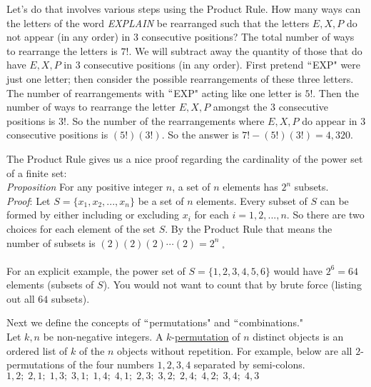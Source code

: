 \documentclass[12pt]{amsart}
\theoremstyle{definition}
\theoremstyle{remark}
\begin{document}
Let's do that involves various steps using the Product Rule.  How many ways can the letters of the word \emph{EXPLAIN} be rearranged such that the letters $E,X,P$ do not appear (in any order) in $3$ consecutive positions?  The total number of ways to rearrange the letters is $7!$.  We will subtract away the quantity of those that do have $E,X,P$ in $3$ consecutive positions (in any order).  First pretend $``$EXP" were just one letter; then consider the possible rearrangements of these three letters.  The number of rearrangements with $``$EXP" acting like one letter is $5!$.  Then the number of ways to rearrange the letter $E,X,P$ amongst the $3$ consecutive positions is $3!$.  So the number of the rearrangements where $E,X,P$ do appear in $3$ consecutive positions is $(5!)(3!)$.  So the answer is $7!-(5!)(3!)=4,320$.




The Product Rule gives us a nice proof regarding the cardinality of the power set of a finite set:\\

\emph{Proposition} For any positive integer $n$, a set of $n$ elements has $2^{n}$ subsets.\\

\emph{Proof}:   Let $S=\{x_1,x_2,...,x_n\}$ be a set of $n$ elements.  Every subset of $S$ can be formed by either including or excluding $x_i$ for each $i=1,2,...,n$.  So there are two choices for each element of the set $S$.  By the Product Rule that means the number of subsets is $(2)(2)(2)\cdots (2)=2^n\;_{\square}$\\ \\

For an explicit example, the power set of $S=\{1,2,3,4,5,6\}$ would have $2^6=64$ elements (subsets of $S$).  You would not want to count that by brute force (listing out all $64$ subsets).


\newpage

Next we define the concepts of $``$permutations" and $``$combinations."\\

Let $k,n$ be non-negative integers.  A $k$-\underline{permutation} of $n$ distinct objects is an ordered list of $k$ of the $n$ objects without repetition.    For example, below are all $2$-permutations of the four numbers $1,2,3,4$ separated by semi-colons.\\

$1,2;\;2,1;\;1,3;\;3,1;\;1,4;\;4,1;\;2,3;\;3,2;\;2,4;\;4,2;\;3,4;\;4,3$\\ \\
\end{document}
